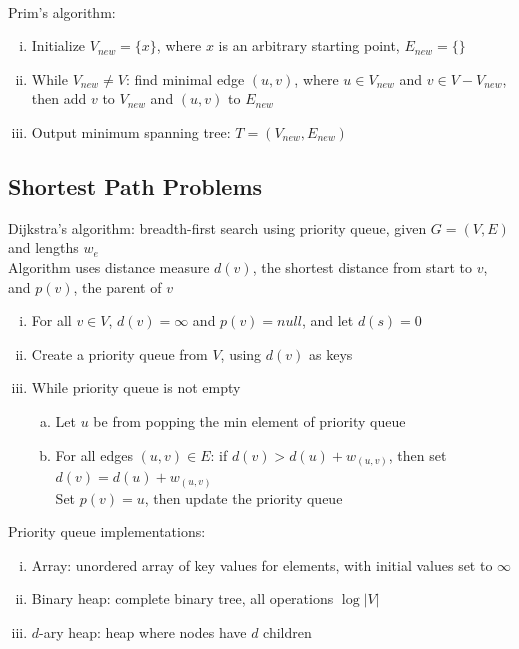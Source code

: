 \documentclass{article}
\begin{document}
			\\
			Prim's algorithm:
			\begin{enumerate}[(i)]
				\item Initialize $V_{new} = \{x\}$, where $x$ is an arbitrary starting point, $E_{new} = \{\}$ 
				\item While $V_{new} \neq V$: find minimal edge $(u, v)$, where $u \in V_{new}$ and $v \in V - V_{new}$, then add $v$ to $V_{new}$ and $(u, v)$ to $E_{new}$
				\item Output minimum spanning tree: $T = (V_{new}, E_{new})$
				\end{enumerate}
		\subsection{Shortest Path Problems}
			Dijkstra's algorithm: breadth-first search using priority queue, given $G = (V, E)$ and lengths $w_e$ \\
			Algorithm uses distance measure $d(v)$, the shortest distance from start to $v$, and $p(v)$, the parent of $v$
			\begin{enumerate}[(i)]
				\item For all $v \in V$, $d(v) = \infty$ and $p(v) = null$, and let $d(s) = 0$
				\item Create a priority queue from $V$, using $d(v)$ as keys
				\item While priority queue is not empty
				\begin{enumerate}[(a)]
					\item Let $u$ be from popping the min element of priority queue
					\item For all edges $(u, v) \in E$: if $d(v) > d(u) + w_{(u, v)}$, then set $d(v) = d(u) + w_{(u, v)}$ \\
					Set $p(v) = u$, then update the priority queue
					\end{enumerate}
				\end{enumerate}
			Priority queue implementations:
			\begin{enumerate}[(i)]
				\item Array: unordered array of key values for elements, with initial values set to $\infty$
				\item Binary heap: complete binary tree, all operations $\log{|V|}$
				\item $d$-ary heap: heap where nodes have $d$ children
				\end{enumerate}
\end{document}
